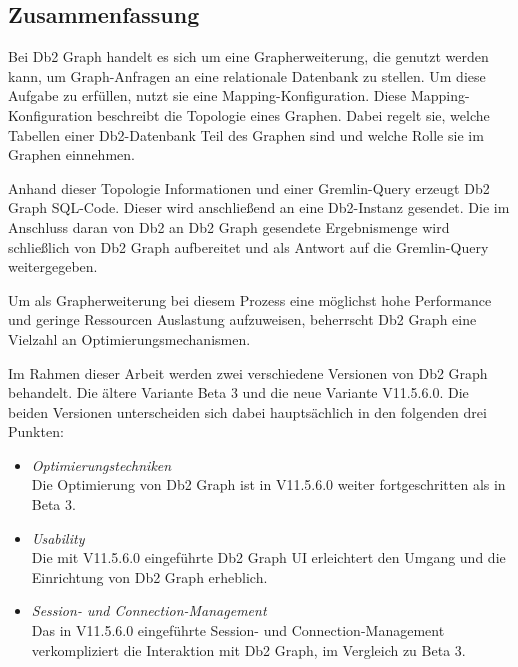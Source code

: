 \subsection{Zusammenfassung}

Bei Db2 Graph handelt es sich um eine Grapherweiterung, die genutzt werden kann, um Graph-Anfragen an eine relationale Datenbank zu stellen. Um diese Aufgabe zu erfüllen, nutzt sie eine Mapping-Konfiguration. Diese Mapping-Konfiguration beschreibt die Topologie eines Graphen. Dabei regelt sie, welche Tabellen einer Db2-Datenbank Teil des Graphen sind und welche Rolle sie im Graphen einnehmen.

Anhand dieser Topologie Informationen und einer Gremlin-Query erzeugt Db2 Graph SQL-Code. Dieser wird anschließend an eine Db2-Instanz gesendet. Die im Anschluss daran von Db2 an Db2 Graph gesendete Ergebnismenge wird schließlich von Db2 Graph aufbereitet und als Antwort auf die Gremlin-Query weitergegeben. 

Um als Grapherweiterung bei diesem Prozess eine möglichst hohe Performance und geringe Ressourcen Auslastung aufzuweisen, beherrscht Db2 Graph eine Vielzahl an Optimierungsmechanismen. 

Im Rahmen dieser Arbeit werden zwei verschiedene Versionen von Db2 Graph behandelt. Die ältere Variante Beta 3 und die neue Variante V11.5.6.0. Die beiden Versionen unterscheiden sich dabei hauptsächlich in den folgenden drei Punkten:

\begin{itemize}
    \item \textit{Optimierungstechniken}\\
    Die Optimierung von Db2 Graph ist in V11.5.6.0 weiter fortgeschritten als in Beta 3. 
    \item \textit{Usability}\\
    Die mit V11.5.6.0 eingeführte Db2 Graph UI erleichtert den Umgang und die Einrichtung von Db2 Graph erheblich. 
    \item \textit{Session- und Connection-Management}\\
    Das in V11.5.6.0 eingeführte Session- und Connection-Management verkompliziert die Interaktion mit Db2 Graph, im Vergleich zu Beta 3.
\end{itemize}